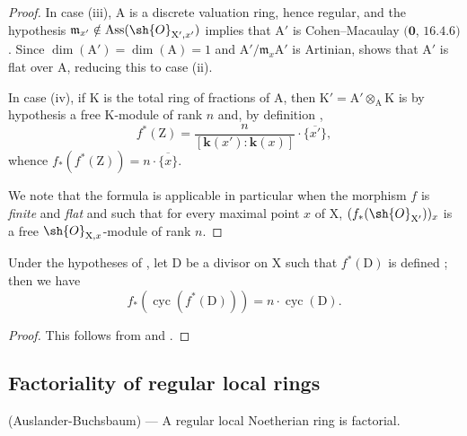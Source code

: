 \begin{proof}
In case (iii), $\mathrm{A}$ is a discrete valuation ring, hence regular, and the hypothesis $\mathfrak{m}_{x'}\notin\operatorname{Ass}(\sh{O}_{\mathrm{X}',x'})$ implies that $\mathrm{A}'$ is Cohen--Macaulay $(\mathbf{0}$, $16.4.6)$.  Since $\dim(\mathrm{A}')=\dim(\mathrm{A})=1$ and $\mathrm{A}'/\mathfrak{m}_x\mathrm{A}'$ is Artinian,  shows that $\mathrm{A}'$ is flat over $\mathrm{A}$, reducing this to case (ii).

In case (iv), if $\mathrm{K}$ is the total ring of fractions of $\mathrm{A}$, then $\mathrm{K}'=\mathrm{A}'\otimes_{\mathrm{A}}\mathrm{K}$ is by hypothesis a free $\mathrm{K}$-module of rank $n$ and, by definition ,
\[
  f^*(\mathrm{Z})=\frac{n}{[\boldsymbol{k}(x'):\boldsymbol{k}(x)]}\cdot\overline{\{x'\}},
\]
whence $f_*(f^*(\mathrm{Z}))=n\cdot\overline{\{x\}}$.

We note that the formula  is applicable in particular when the morphism $f$ is \emph{finite} and \emph{flat} and such that for every maximal point $x$ of $\mathrm{X}$, $(f_*(\sh{O}_{\mathrm{X}'}))_x$ is a free $\sh{O}_{\mathrm{X},x}$-module of rank $n$.
\end{proof}

\begin{corollary}[21.10.19]
\label{IV.21.10.19}
Under the hypotheses of , let $\mathrm{D}$ be a divisor on $\mathrm{X}$ such that $f^*(\mathrm{D})$ is defined ; then we have
\[
\label{IV.21.10.19.1}
  f_*(\operatorname{cyc}(f^*(\mathrm{D})))=n\cdot\operatorname{cyc}(\mathrm{D}).
  \tag{21.10.19.1}
\]
\end{corollary}

\begin{proof}
This follows from  and .
\end{proof}

\subsection{Factoriality of regular local rings}
\label{subsection:IV.21.11}

\begin{theorem}[21.11.1]
\label{IV.21.11.1}
\textup{(Auslander-Buchsbaum)} ---
A regular local Noetherian ring is factorial.
\end{theorem}

